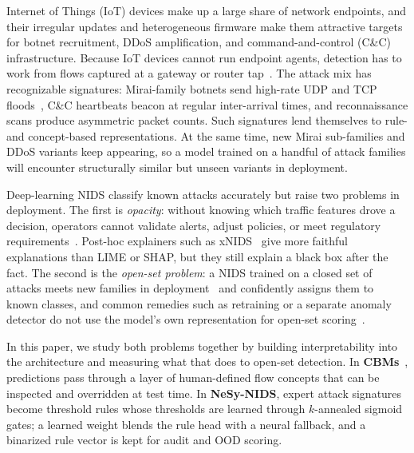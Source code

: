 \documentclass[journal]{IEEEtran}
\begin{document}
Internet of Things (IoT) devices make up a large share of network endpoints, and their irregular updates and heterogeneous firmware make them attractive targets for botnet recruitment, DDoS amplification, and command-and-control (C\&C) infrastructure. Because IoT devices cannot run endpoint agents, detection has to work from flows captured at a gateway or router tap~\cite{mirsky2018kitsune}. The attack mix has recognizable signatures: Mirai-family botnets send high-rate UDP and TCP floods~\cite{meidan2018nbaiot}, C\&C heartbeats beacon at regular inter-arrival times, and reconnaissance scans produce asymmetric packet counts. Such signatures lend themselves to rule- and concept-based representations. At the same time, new Mirai sub-families and DDoS variants keep appearing, so a model trained on a handful of attack families will encounter structurally similar but unseen variants in deployment.

Deep-learning NIDS classify known attacks accurately but raise two problems in deployment. The first is \emph{opacity}: without knowing which traffic features drove a decision, operators cannot validate alerts, adjust policies, or meet regulatory requirements~\cite{rudin2019stop,arp2022dos}. Post-hoc explainers such as xNIDS~\cite{wei2023xnids} give more faithful explanations than LIME or SHAP, but they still explain a black box after the fact. The second is the \emph{open-set problem}: a NIDS trained on a closed set of attacks meets new families in deployment~\cite{arp2022dos} and confidently assigns them to known classes, and common remedies such as retraining or a separate anomaly detector do not use the model's own representation for open-set scoring~\cite{han2023owad}.

In this paper, we study both problems together by building interpretability into the architecture and measuring what that does to open-set detection. In \textbf{CBMs}~\cite{koh2020concept}, predictions pass through a layer of human-defined flow concepts that can be inspected and overridden at test time. In \textbf{NeSy-NIDS}, expert attack signatures become threshold rules whose thresholds are learned through $k$-annealed sigmoid gates; a learned weight blends the rule head with a neural fallback, and a binarized rule vector is kept for audit and OOD scoring.
\end{document}
